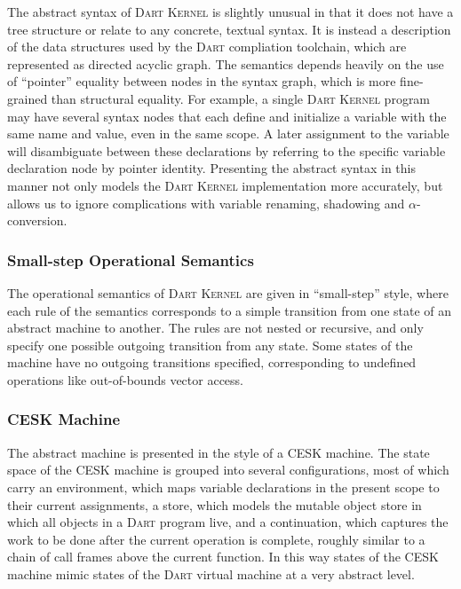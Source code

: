 \documentclass[a4paper,oneside,fleqn]{article}
\newcommand{\kernel}{\textsc{Dart Kernel}}
\newcommand{\dart}{\textsc{Dart}}
\begin{document}
The abstract syntax of \kernel{} is slightly unusual in that it does not have a tree structure or relate to any concrete, textual syntax.
It is instead a description of the data structures used by the \dart{} compliation toolchain, which are represented as directed acyclic graph.
The semantics depends heavily on the use of ``pointer'' equality between nodes in the syntax graph, which is more fine-grained than structural equality.
For example, a single \kernel{} program may have several syntax nodes that each define and initialize a variable with the same name and value, even in the same scope.
A later assignment to the variable will disambiguate between these declarations by referring to the specific variable declaration node by pointer identity.
Presenting the abstract syntax in this manner not only models the \kernel{} implementation more accurately, but allows us to ignore complications with variable renaming, shadowing and $\alpha$-conversion.

\subsubsection{Small-step Operational Semantics}

The operational semantics of \kernel{} are given in ``small-step'' style, where each rule of the semantics corresponds to a simple transition from one state of an abstract machine to another.
The rules are not nested or recursive, and only specify one possible outgoing transition from any state.
Some states of the machine have no outgoing transitions specified, corresponding to undefined operations like out-of-bounds vector access.

\subsubsection{CESK Machine}

The abstract machine is presented in the style of a CESK machine. 
The state space of the CESK machine is grouped into several configurations, most of which carry an environment, which maps variable declarations in the present scope to their current assignments, a store, which models the mutable object store in which all objects in a \dart{} program live, and a continuation, which captures the work to be done after the current operation is complete, roughly similar to a chain of call frames above the current function.
In this way states of the CESK machine mimic states of the \dart{} virtual machine at a very abstract level.
\end{document}
